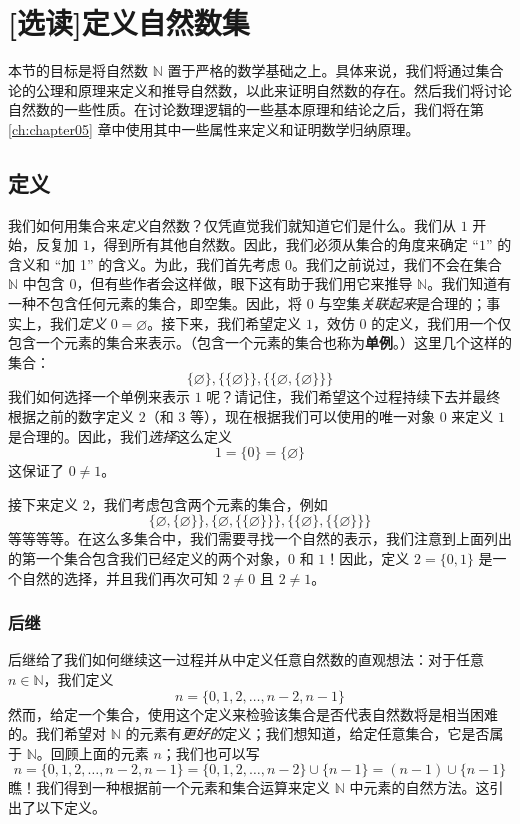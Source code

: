 \section[定义自然数集]{[选读]定义自然数集}

本节的目标是将自然数 $\mathbb{N}$ 置于严格的数学基础之上。具体来说，我们将通过集合论的公理和原理来定义和推导自然数，以此来证明自然数的存在。然后我们将讨论自然数的一些性质。在讨论数理逻辑的一些基本原理和结论之后，我们将在第 \ref{ch:chapter05} 章中使用其中一些属性来定义和证明数学归纳原理。

\subsection{定义}

我们如何用集合来\emph{定义}自然数？仅凭直觉我们就知道它们是什么。我们从 $1$ 开始，反复加 $1$，得到所有其他自然数。因此，我们必须从集合的角度来确定 ``$1$'' 的含义和 ``加 1'' 的含义。为此，我们首先考虑 $0$。我们之前说过，我们不会在集合 $\mathbb{N}$ 中包含 $0$，但有些作者会这样做，眼下这有助于我们用它来推导 $\mathbb{N}$。我们知道有一种不包含任何元素的集合，即空集。因此，将 $0$ 与空集\emph{关联起来}是合理的；事实上，我们\emph{定义} $0 = \varnothing$。接下来，我们希望定义 $1$，效仿 $0$ 的定义，我们用一个仅包含一个元素的集合来表示。（包含一个元素的集合也称为\textbf{单例}。）这里几个这样的集合：
\[\{\varnothing\}, \{\{\varnothing\}\} , \{\{\varnothing, \{\varnothing\}\}\}\]
我们如何选择一个单例来表示 $1$ 呢？请记住，我们希望这个过程持续下去并最终根据之前的数字定义 $2$（和 $3$ 等），现在根据我们可以使用的唯一对象 $0$ 来定义 $1$ 是合理的。因此，我们\emph{选择}这么定义
\[1 = \{0\} = \{\varnothing\}\]
这保证了 $0 \ne 1$。

接下来定义 $2$，我们考虑包含两个元素的集合，例如
\[\{\varnothing, \{\varnothing\}\}, \{\varnothing, \{\{\varnothing\}\}\}, \{\{\varnothing\}, \{\{\varnothing\}\}\}\]
等等等等。在这么多集合中，我们需要寻找一个自然的表示，我们注意到上面列出的第一个集合包含我们已经定义的两个对象，$0$ 和 $1$！因此，定义 $2 = \{0, 1\}$ 是一个自然的选择，并且我们再次可知 $2 \ne 0$ 且 $2 \ne 1$。

\subsubsection*{后继}

后继给了我们如何继续这一过程并从中定义任意自然数的直观想法：对于任意 $n \in \mathbb{N}$，我们定义
\[n = \{0, 1, 2, \dots , n - 2, n - 1\}\]
然而，给定一个集合，使用这个定义来检验该集合是否代表自然数将是相当困难的。我们希望对 $\mathbb{N}$ 的元素有\emph{更好的}定义；我们想知道，给定任意集合，它是否属于 $\mathbb{N}$。回顾上面的元素 $n$；我们也可以写
\[n = \{0, 1, 2, \dots , n - 2, n - 1\} = \{0, 1, 2, \dots , n - 2\} \cup \{n-1\} = (n-1) \cup \{n-1\}\]
瞧！我们得到一种根据前一个元素和集合运算来定义 $\mathbb{N}$ 中元素的自然方法。这引出了以下定义。

